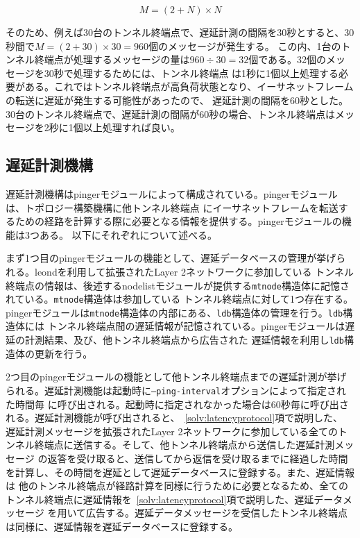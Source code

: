 \begin{displaymath}
\displaystyle M = (2 + N) \times N
\end{displaymath}

そのため、例えば30台のトンネル終端点で、遅延計測の間隔を30秒とすると、30秒間で$ M = (2 + 30) \times 30 = 960 $個のメッセージが発生する。
この内、1台のトンネル終端点が処理するメッセージの量は$ 960 \div 30 = 32 $個である。32個のメッセージを30秒で処理するためには、トンネル終端点
は1秒に1個以上処理する必要がある。これではトンネル終端点が高負荷状態となり、イーサネットフレームの転送に遅延が発生する可能性があったので、
遅延計測の間隔を60秒とした。30台のトンネル終端点で、遅延計測の間隔が60秒の場合、トンネル終端点はメッセージを2秒に1個以上処理すれば良い。

\subsection{遅延計測機構}
\label{solv:latency}

遅延計測機構はpingerモジュールによって構成されている。pingerモジュールは、トポロジー構築機構に他トンネル終端点
にイーサネットフレームを転送するための経路を計算する際に必要となる情報を提供する。pingerモジュールの機能は3つある。
以下にそれぞれについて述べる。

まず1つ目のpingerモジュールの機能として、遅延データベースの管理が挙げられる。leondを利用して拡張されたLayer 2ネットワークに参加している
トンネル終端点の情報は、後述するnodelistモジュールが提供する\texttt{mtnode}構造体に記憶されている。\texttt{mtnode}構造体は参加している
トンネル終端点に対して1つ存在する。pingerモジュールは\texttt{mtnode}構造体の内部にある、\texttt{ldb}構造体の管理を行う。\texttt{ldb}構造体には
トンネル終端点間の遅延情報が記憶されている。pingerモジュールは遅延の計測結果、及び、他トンネル終端点から広告された
遅延情報を利用し\texttt{ldb}構造体の更新を行う。

2つ目のpingerモジュールの機能として他トンネル終端点までの遅延計測が挙げられる。遅延計測機能は起動時に\texttt{--ping-interval}オプションによって指定された時間毎
に呼び出される。起動時に指定されなかった場合は60秒毎に呼び出される。遅延計測機能が呼び出されると、~\ref{solv:latencyprotocol}項で説明した、
遅延計測メッセージを拡張されたLayer 2ネットワークに参加している全てのトンネル終端点に送信する。そして、他トンネル終端点から送信した遅延計測メッセージ
の返答を受け取ると、送信してから返信を受け取るまでに経過した時間を計算し、その時間を遅延として遅延データベースに登録する。また、遅延情報は
他のトンネル終端点が経路計算を同様に行うために必要となるため、全てのトンネル終端点に遅延情報を~\ref{solv:latencyprotocol}項で説明した、遅延データメッセージ
を用いて広告する。遅延データメッセージを受信したトンネル終端点は同様に、遅延情報を遅延データベースに登録する。

